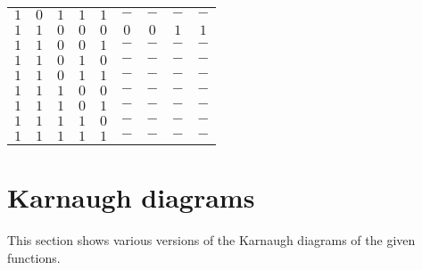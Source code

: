 \documentclass [15pt,a4paper,twoside]{article}
\begin{document}
\begin{center}
\begin{tabular}{ccccc|cccc}
		$1$ & $0$ & $1$ & $1$ & $1$ & $-$ & $-$ & $-$ & $-$ \\
		$1$ & $1$ & $0$ & $0$ & $0$ & $0$ & $0$ & $1$ & $1$ \\
		$1$ & $1$ & $0$ & $0$ & $1$ & $-$ & $-$ & $-$ & $-$ \\
		$1$ & $1$ & $0$ & $1$ & $0$ & $-$ & $-$ & $-$ & $-$ \\
		$1$ & $1$ & $0$ & $1$ & $1$ & $-$ & $-$ & $-$ & $-$ \\
		$1$ & $1$ & $1$ & $0$ & $0$ & $-$ & $-$ & $-$ & $-$ \\
		$1$ & $1$ & $1$ & $0$ & $1$ & $-$ & $-$ & $-$ & $-$ \\
		$1$ & $1$ & $1$ & $1$ & $0$ & $-$ & $-$ & $-$ & $-$ \\
		$1$ & $1$ & $1$ & $1$ & $1$ & $-$ & $-$ & $-$ & $-$ \\
		
	\end{tabular}
\end{center}
\section{Karnaugh diagrams}
This section shows various versions of the Karnaugh diagrams of the given functions.
\end{document}
